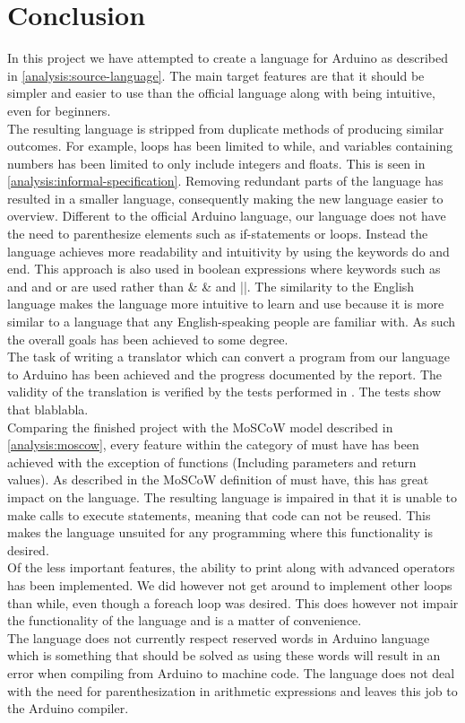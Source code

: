 \section{Conclusion}

In this project we have attempted to create a language for Arduino as described in \ref{analysis:source-language}. The main target features are that it should be simpler and easier to use than the official language along with being intuitive, even for beginners. \\
The resulting language is stripped from duplicate methods of producing similar outcomes. For example, loops has been limited to while, and variables containing numbers has been limited to only include integers and floats. This is seen in \ref{analysis:informal-specification}. Removing redundant parts of the language has resulted in a smaller language, consequently making the new language easier to overview. Different to the official Arduino language, our language does not have the need to parenthesize elements such as if-statements or loops. Instead the language achieves more readability and intuitivity by using the keywords do and end. This approach is also used in boolean expressions where keywords such as and and or are used rather than \& \& and  ||. The similarity to the English language makes the language more intuitive to learn and use because it is more similar to a language that any English-speaking people are familiar with. As such the overall goals has been achieved to some degree. \\
The task of writing a translator which can convert a program from our language to Arduino has been achieved and the progress documented by the report. The validity of the translation is verified by the tests performed in . The tests show that blablabla. \\
Comparing the finished project with the MoSCoW model described in \ref{analysis:moscow}, every feature within the category of must have has been achieved with the exception of functions (Including parameters and return values). As described in the MoSCoW definition of must have, this has great impact on the language. The resulting language is impaired in that it is unable to make calls to execute statements, meaning that code can not be reused. This makes the language unsuited for any programming where this functionality is desired. \\
Of the less important features, the ability to print along with advanced operators has been implemented. We did however not get around to implement other loops than while, even though a foreach loop was desired. This does however not impair the functionality of the language and is a matter of convenience. \\
The language does not currently respect reserved words in Arduino language which is something that should be solved as using these words will result in an error when compiling from Arduino to machine code. The language does not deal with the need for parenthesization in arithmetic expressions and leaves this job to the Arduino compiler.

